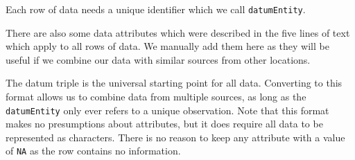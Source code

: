 \documentclass{article}
\newenvironment{Shaded}{\begin{snugshade}}{\end{snugshade}}
\newcommand{\AttributeTok}[1]{\textcolor[rgb]{0.77,0.63,0.00}{#1}}
\newcommand{\CommentTok}[1]{\textcolor[rgb]{0.56,0.35,0.01}{\textit{#1}}}
\newcommand{\DecValTok}[1]{\textcolor[rgb]{0.00,0.00,0.81}{#1}}
\newcommand{\FloatTok}[1]{\textcolor[rgb]{0.00,0.00,0.81}{#1}}
\newcommand{\FunctionTok}[1]{\textcolor[rgb]{0.00,0.00,0.00}{#1}}
\newcommand{\NormalTok}[1]{#1}
\newcommand{\OtherTok}[1]{\textcolor[rgb]{0.56,0.35,0.01}{#1}}
\newcommand{\SpecialCharTok}[1]{\textcolor[rgb]{0.00,0.00,0.00}{#1}}
\newcommand{\StringTok}[1]{\textcolor[rgb]{0.31,0.60,0.02}{#1}}
\begin{document}
Each row of data needs a unique identifier which we call \texttt{datumEntity}.

\begin{Shaded}
\end{Shaded}

There are also some data attributes which were described in the five lines of text which apply to all rows of data. We manually add them here as they will be useful if we combine our data with similar sources from other locations.

\begin{Shaded}
\end{Shaded}

The datum triple is the universal starting point for all data. Converting to this format allows us to combine data from multiple sources, as long as the \texttt{datumEntity} only ever refers to a unique observation. Note that this format makes no presumptions about attributes, but it does require all data to be represented as characters. There is no reason to keep any attribute with a value of \texttt{NA} as the row contains no information.
\end{document}
